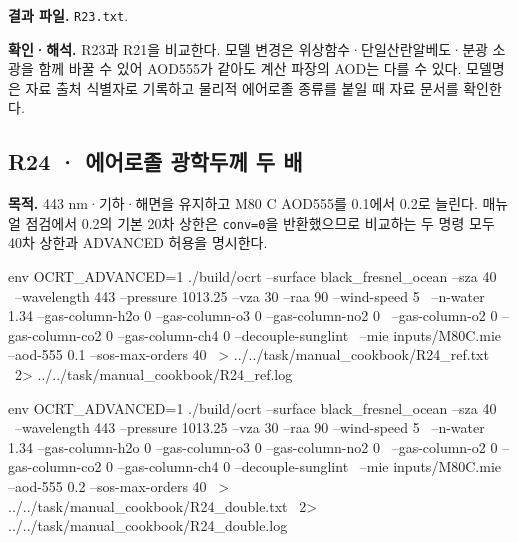 \textbf{결과 파일. }\texttt{R23.txt}.

\textbf{확인·해석. }R23과 R21을 비교한다. 모델 변경은 위상함수·단일산란알베도·분광 소광을 함께 바꿀 수 있어 AOD555가 같아도 계산 파장의 AOD는 다를 수 있다. 모델명은 자료 출처 식별자로 기록하고 물리적 에어로졸 종류를 붙일 때 자료 문서를 확인한다.


\subsection{R24 · 에어로졸 광학두께 두 배}
\label{sec:auto:09_cookbook:5.4}

\label{recipe:R24}

\textbf{목적. }443 nm·기하·해면을 유지하고 M80 C AOD555를 0.1에서 0.2로 늘린다. 매뉴얼 점검에서 0.2의 기본 20차 상한은 \texttt{conv=\allowbreak{}0}을 반환했으므로 비교하는 두 명령 모두 40차 상한과 ADVANCED 허용을 명시한다.

\noindent\begin{minipage}{\linewidth}
\begin{ManualCode}

env OCRT_ADVANCED=1 ./build/ocrt --surface black_fresnel_ocean --sza 40 \
  --wavelength 443 --pressure 1013.25 --vza 30 --raa 90 --wind-speed 5 \
  --n-water 1.34 --gas-column-h2o 0 --gas-column-o3 0 --gas-column-no2 0 \
  --gas-column-o2 0 --gas-column-co2 0 --gas-column-ch4 0 --decouple-sunglint \
  --mie inputs/M80C.mie --aod-555 0.1 --sos-max-orders 40 \
  > ../../task/manual_cookbook/R24_ref.txt \
  2> ../../task/manual_cookbook/R24_ref.log

\end{ManualCode}
\end{minipage}\par

\noindent\begin{minipage}{\linewidth}
\begin{ManualCode}

env OCRT_ADVANCED=1 ./build/ocrt --surface black_fresnel_ocean --sza 40 \
  --wavelength 443 --pressure 1013.25 --vza 30 --raa 90 --wind-speed 5 \
  --n-water 1.34 --gas-column-h2o 0 --gas-column-o3 0 --gas-column-no2 0 \
  --gas-column-o2 0 --gas-column-co2 0 --gas-column-ch4 0 --decouple-sunglint \
  --mie inputs/M80C.mie --aod-555 0.2 --sos-max-orders 40 \
  > ../../task/manual_cookbook/R24_double.txt \
  2> ../../task/manual_cookbook/R24_double.log

\end{ManualCode}
\end{minipage}\par

